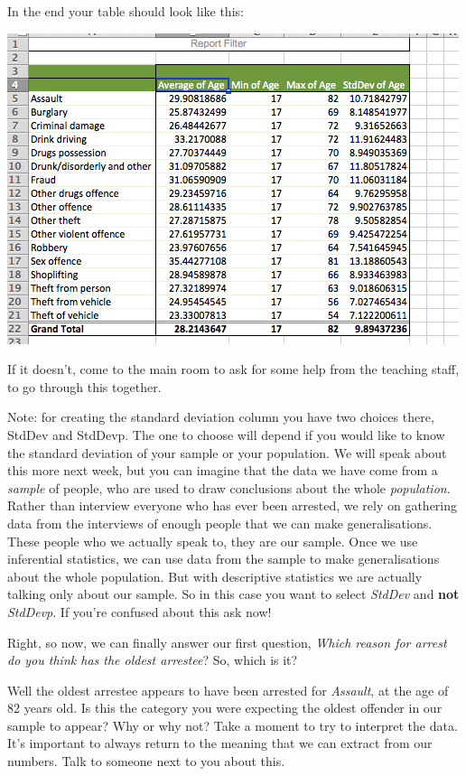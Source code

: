 \documentclass[
]{book}
\begin{document}
In the end your table should look like this:

\includegraphics{imgs/reason_v_age_no_med.png}

If it doesn't, come to the main room to ask for some help from the teaching staff, to go through this together.

Note: for creating the standard deviation column you have two choices there, StdDev and StdDevp. The one to choose will depend if you would like to know the standard deviation of your sample or your population. We will speak about this more next week, but you can imagine that the data we have come from a \emph{sample} of people, who are used to draw conclusions about the whole \emph{population}. Rather than interview everyone who has ever been arrested, we rely on gathering data from the interviews of enough people that we can make generalisations. These people who we actually speak to, they are our sample. Once we use inferential statistics, we can use data from the sample to make generalisations about the whole population. But with descriptive statistics we are actually talking only about our sample. So in this case you want to select \emph{StdDev} and \textbf{not} \emph{StdDevp}. If you're confused about this ask now!

Right, so now, we can finally answer our first question, \emph{Which reason for arrest do you think has the oldest arrestee}? So, which is it?

Well the oldest arrestee appears to have been arrested for \emph{Assault}, at the age of 82 years old. Is this the category you were expecting the oldest offender in our sample to appear? Why or why not? Take a moment to try to interpret the data. It's important to always return to the meaning that we can extract from our numbers. Talk to someone next to you about this.
\end{document}
